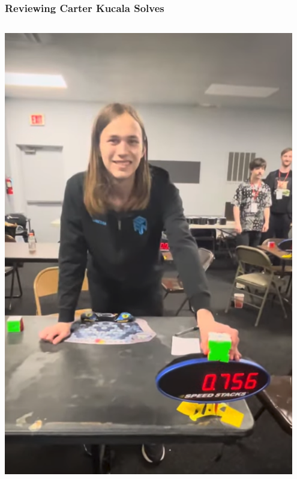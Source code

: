 \documentclass[aspectratio=169]{beamer}
\begin{document}
\begin{frame}
\frametitle{Reviewing Carter Kucala Solves}
\begin{columns}
\begin{column}{0.2\textwidth}
    \begin{center}
        \includegraphics[width=0.95\textwidth]{carter.png}
    \end{center}
\end{column}



\end{columns}
\end{frame}
\end{document}
